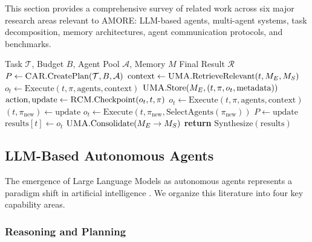 \documentclass{article}
\theoremstyle{plain}
\theoremstyle{definition}
\theoremstyle{remark}
\begin{document}
This section provides a comprehensive survey of related work across six major research areas relevant to AMORE: LLM-based agents, multi-agent systems, task decomposition, memory architectures, agent communication protocols, and benchmarks.
\begin{algorithm}[t]
	\caption{\amore{} Execution Loop}
	\label{alg:amore}
	\small
	\begin{algorithmic}[1]
		\REQUIRE Task $\mathcal{T}$, Budget $B$, Agent Pool $\mathcal{A}$, Memory $M$
		\ENSURE Final Result $\mathcal{R}$
		\STATE $P \leftarrow \textsc{CAR}{}.\text{CreatePlan}(\mathcal{T}, B, \mathcal{A})$
		\STATE $\text{context} \leftarrow \textsc{UMA}{}.\text{RetrieveRelevant}(t, M_E, M_S)$
		\STATE $o_t \leftarrow \text{Execute}(t, \pi, \text{agents}, \text{context})$
		\STATE $\textsc{UMA}{}.\text{Store}(M_E, (t, \pi, o_t, \text{metadata}))$
		\STATE $\text{action}, \text{update} \leftarrow \textsc{RCM}{}.\text{Checkpoint}(o_t, t, \pi)$
		\STATE $o_t \leftarrow \text{Execute}(t, \pi, \text{agents}, \text{context})$
		\STATE $(t, \pi_{\text{new}}) \leftarrow \text{update}$
		\STATE $o_t \leftarrow \text{Execute}(t, \pi_{\text{new}}, \text{SelectAgents}(\pi_{\text{new}}))$
		\STATE $P \leftarrow \text{update}$ 
		\ENDIF
		\STATE $\text{results}[t] \leftarrow o_t$
		\ENDFOR
		\STATE $\textsc{UMA}{}.\text{Consolidate}(M_E \rightarrow M_S)$
		\STATE \textbf{return} $\text{Synthesize}(\text{results})$
	\end{algorithmic}
\end{algorithm}

\subsection{LLM-Based Autonomous Agents}
\label{sec:related_llm_agents}

The emergence of Large Language Models as autonomous agents represents a paradigm shift in artificial intelligence \citep{xi2023rise, wang2024survey}. We organize this literature into four key capability areas.

\subsubsection{Reasoning and Planning}
\end{document}
